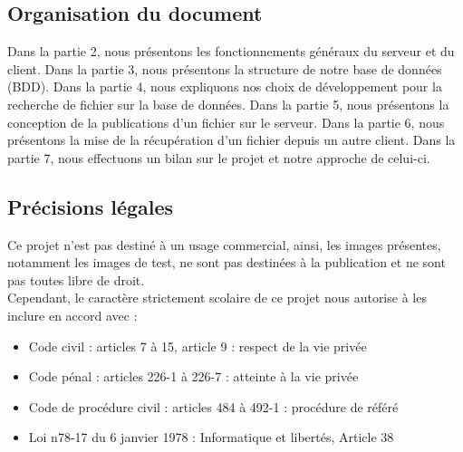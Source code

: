 \subsection{Organisation du document}

Dans la partie 2, nous présentons les fonctionnements généraux du serveur et du client.
\vskip 0.25cm
Dans la partie 3, nous présentons la structure de notre base de données (BDD).
\vskip 0.25cm
Dans la partie 4, nous expliquons nos choix de développement pour la recherche de fichier sur la base de données.
\vskip 0.25cm
Dans la partie 5, nous présentons la conception de la publications d'un fichier sur le serveur.
\vskip 0.25cm
Dans la partie 6, nous présentons la mise de la récupération d'un fichier depuis un autre client.
\vskip 0.25cm
Dans la partie 7, nous effectuons un bilan sur le projet et notre approche de celui-ci.

\subsection{Précisions légales}
Ce projet n'est pas destiné à un usage commercial, ainsi, les images présentes, notamment les images de test, ne sont pas destinées à la publication et ne sont pas toutes libre de droit.\\
\vskip 0.25cm
Cependant, le caractère strictement scolaire de ce projet nous autorise à les inclure en accord avec : 
\begin{itemize}
    \item Code civil : articles 7 à 15, article 9 : respect de la vie privée
    \item Code pénal : articles 226-1 à 226-7 : atteinte à la vie privée
    \item Code de procédure civil : articles 484 à 492-1 : procédure de référé
    \item Loi n78-17 du 6 janvier 1978 : Informatique et libertés, Article 38
\end{itemize}